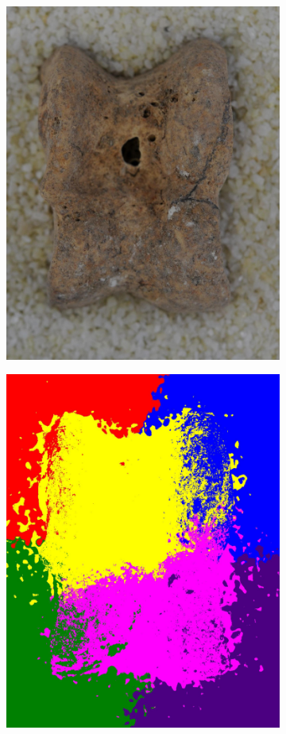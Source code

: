 \documentclass[pdftex,12pt,a4paper]{report}
\begin{document}
\begin{figure}[h]
\begin{subfigure}[b]{0.24\textwidth}
		\subcaption*{}
		\label{}
	\end{subfigure}
	\begin{subfigure}[b]{0.24\textwidth}
		\centering
		\includegraphics[width=.9\linewidth]{img/segmentation/bad/slic/cut.jpg}
		\subcaption{}
		\label{fig:slic:bad}
	\end{subfigure}
	\begin{subfigure}[b]{0.24\textwidth}
		\centering
		\includegraphics[width=.9\linewidth]{img/segmentation/bad/slic/segmented.jpg}

\end{subfigure}
\end{figure}
\end{document}
